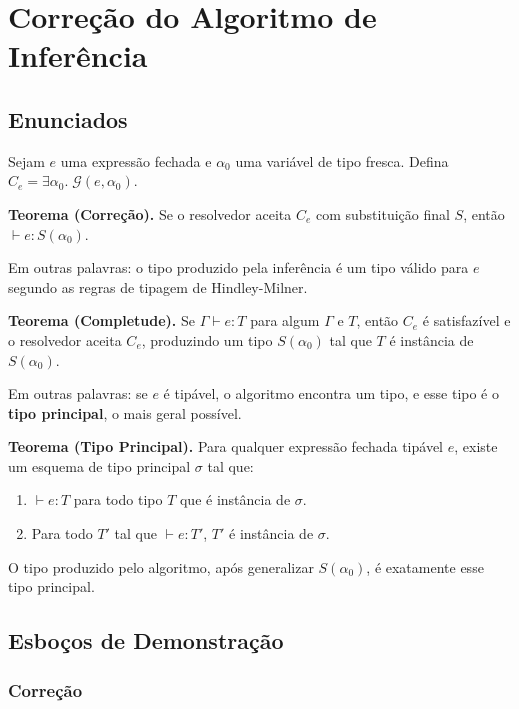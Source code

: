   \section{Correção do Algoritmo de Inferência}

  \subsection{Enunciados}

  Sejam \(e\) uma expressão fechada e \(\alpha_0\) uma variável de tipo
  fresca. Defina \(C_e = \exists \alpha_0.\; \mathcal{G}(e, \alpha_0)\).

  \textbf{Teorema (Correção).} Se o resolvedor aceita \(C_e\) com
  substituição final \(S\), então \(\vdash e : S(\alpha_0)\).

  Em outras palavras: o tipo produzido pela inferência é um tipo válido
  para \(e\) segundo as regras de tipagem de Hindley-Milner.

  \textbf{Teorema (Completude).} Se \(\Gamma \vdash e : T\) para algum
  \(\Gamma\) e \(T\), então \(C_e\) é satisfazível e o resolvedor
  aceita \(C_e\), produzindo um tipo \(S(\alpha_0)\) tal que \(T\) é
  instância de \(S(\alpha_0)\).

  Em outras palavras: se \(e\) é tipável, o algoritmo encontra um tipo,
  e esse tipo é o \textbf{tipo principal}, o mais geral possível.

  \textbf{Teorema (Tipo Principal).} Para qualquer expressão fechada
  tipável \(e\), existe um esquema de tipo principal \(\sigma\) tal que:

  \begin{enumerate}
    \item
      \(\vdash e : T\) para todo tipo \(T\) que é instância de \(\sigma\).
    \item
      Para todo \(T'\) tal que \(\vdash e : T'\), \(T'\) é instância de
      \(\sigma\).
  \end{enumerate}

  O tipo produzido pelo algoritmo, após generalizar \(S(\alpha_0)\),
  é exatamente esse tipo principal.

  \subsection{Esboços de Demonstração}

  \subsubsection{Correção}

